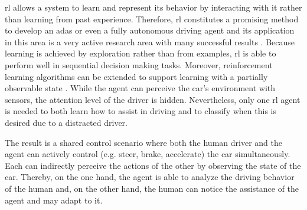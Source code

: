 \Gls{rl} allows a system to learn and represent its behavior by interacting with it rather than learning from past experience. Therefore, \gls{rl} constitutes a promising method to develop an \gls{adas} or even a fully autonomous driving agent and its application in this area is a very active research area with many successful results \parencite{rl_driving_survey}. Because learning is achieved by exploration rather than from examples, \gls{rl} is able to perform well in sequential decision making tasks. Moreover, reinforcement learning algorithms can be extended to support learning with a partially observable state \parencite[p.~466]{RL_introductio}. While the agent can perceive the car's environment with sensors, the attention level of the driver is hidden. Nevertheless, only one \gls{rl} agent is needed to both learn how to assist in driving and to classify when this is desired due to a distracted driver.

The result is a shared control scenario where both the human driver and the agent can actively control (e.g. steer, brake, accelerate) the car simultaneously. Each can indirectly perceive the actions of the other by observing the state of the car. Thereby, on the one hand, the agent is able to analyze the driving behavior of the human and, on the other hand, the human can notice the assistance of the agent and may adapt to it. 








